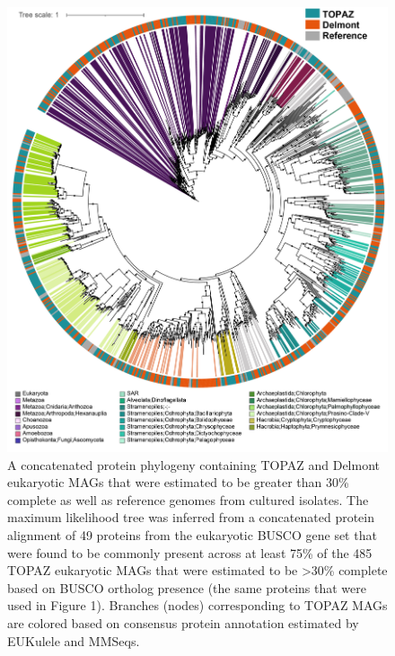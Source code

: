 \documentclass[12pt]{article}
\numberwithin{equation}{section}
\begin{document}
\begin{figure}
    \centering
    \includegraphics[width=0.95\columnwidth]{si-figures/si-combined-phylogeny-delmont-01.png}
    \caption{A concatenated protein phylogeny containing TOPAZ and Delmont \citep{Delmont_2020} eukaryotic MAGs that were estimated to be greater than 30\% complete as well as reference genomes from cultured isolates. The maximum likelihood tree was inferred from a concatenated protein alignment of 49 proteins from the eukaryotic BUSCO gene set that were found to be commonly present across at least 75\% of the 485 TOPAZ eukaryotic MAGs that were estimated to be >30\% complete based on BUSCO ortholog presence (the same proteins that were used in Figure 1). Branches (nodes) corresponding to TOPAZ MAGs are colored based on consensus protein annotation estimated by EUKulele and MMSeqs. }
        \label{fig:delmontphylo}
\end{figure}
\end{document}
